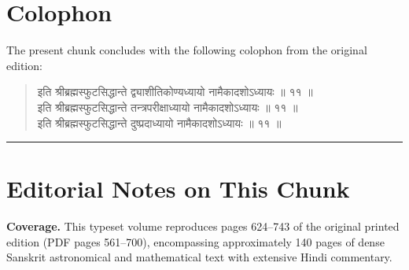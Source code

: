 \documentclass[11pt,a4paper]{article}
\newcommand{\skt}[1]{{\devanagarifont\color{sktcolor} #1}}
\newenvironment{shloka}{%
  \begin{quote}%
  \smallskip%
  \devanagarifont\color{sktcolor}%
}{%
  \smallskip%
  \end{quote}%
}
\begin{document}
\newpage
\section*{Colophon}

The present chunk concludes with the following colophon from the original edition:

\begin{shloka}
\skt{इति श्रीब्रह्मस्फुटसिद्धान्ते द्व्याशीतिकोण्यध्यायो नामैकादशोऽध्यायः ॥ ११ ॥}\\[0.5em]
\skt{इति श्रीब्रह्मस्फुटसिद्धान्ते तन्त्रपरीक्षाध्यायो नामैकादशोऽध्यायः ॥ ११ ॥}\\[0.5em]
\skt{इति श्रीब्रह्मस्फुटसिद्धान्ते दुष्प्रदाध्यायो नामैकादशोऽध्यायः ॥ ११ ॥}
\end{shloka}

\vspace{1cm}

\noindent\rule{\textwidth}{0.4pt}

\section*{Editorial Notes on This Chunk}

\textbf{Coverage.} This typeset volume reproduces pages 624--743 of the original printed edition (PDF pages 561--700), encompassing approximately 140 pages of dense Sanskrit astronomical and mathematical text with extensive Hindi commentary.
\end{document}
